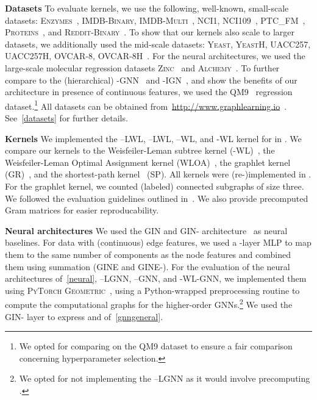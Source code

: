 \documentclass{article}
\newcommand{\xhdr}[1]{{\noindent\bfseries #1}}
\theoremstyle{definition}
\newcommand{\CC}[1][]{}
\newcommand{\wl}{-\textsf{WL}\xspace}
\newcommand{\kwl}{-\textsf{WL}\xspace}
\newcommand{\deltakwl}{--\textsf{WL}\xspace}
\newcommand{\localkwl}{--\textsf{LWL}\xspace}
\newcommand{\pluskwl}{--\textsf{LWL}\xspace}
\newcommand{\deltakwln}{--\textsf{GNN}\xspace}
\newcommand{\localkwln}{--\textsf{LGNN}\xspace}
\newcommand{\kwln}{-\textsf{WL-GNN}\xspace}
\newcommand{\kgnn}{\textrm{-}\textsf{GNN}\xspace}
\newcommand{\kign}{\textrm{-}\textsf{IGN}\xspace}
\newcommand{\shp}{\textsf{SP}\xspace}
\newcommand{\gr}{\textsf{GR}\xspace}
\newcommand{\wloa}{\textsf{WLOA}\xspace}
\newcommand{\gin}{\textsf{GIN}\xspace}
\newcommand{\gine}{\textsf{GINE}\xspace}
\newcommand{\gineps}{\textsf{GIN-}\xspace}
\newcommand{\gineeps}{\textsf{GINE-}\xspace}
\begin{document}
\xhdr{Datasets} To evaluate kernels, we use the following, well-known, small-scale datasets: \textsc{Enzymes}~\cite{Sch+2004,Bor+2005}, \textsc{IMDB-Binary}, \textsc{IMDB-Multi}~\cite{Yan+2015a}, \textsc{NCI1}, \textsc{NCI109}~\cite{Wal+2008}, \textsc{PTC\_FM}~\cite{Hel+2001}, \textsc{Proteins}~\cite{Dob+2003,Bor+2005}, and \textsc{Reddit-Binary}~\cite{Yan+2015a}. To show that our kernels also scale to larger datasets, we additionally used the mid-scale datasets: \textsc{Yeast}, \textsc{YeastH}, \textsc{UACC257}, \textsc{UACC257H}, \textsc{OVCAR-8}, \textsc{OVCAR-8H}~\cite{Yan+2008}. For the neural architectures, we used the large-scale molecular regression datasets \textsc{Zinc}~\cite{Dwi+2020,Jin+2018a} and \textsc{Alchemy}~\cite{Che+2020}.
To further compare to the (hierarchical) \kgnn~\cite{Mor+2019} and \kign~\cite{Mar+2019}, and show the benefits of our architecture in presence of continuous features, we used the \textsc{QM9}~\cite{Ram+2014,Wu+2018} regression dataset.\footnote{We opted for comparing on the \textsc{QM9} dataset to ensure a fair comparison concerning hyperparameter selection.}  All datasets can be obtained from~\url{http://www.graphlearning.io}~\cite{Mor+2020}. See~\cref{datasets} for further details.

\xhdr{Kernels} We implemented the \localkwl, \pluskwl, \deltakwl, and  \kwl kernel for  in . We compare our kernels to the Weisfeiler-Leman subtree kernel (\wl)~\cite{She+2011}, the Weisfeiler-Leman Optimal Assignment kernel (\wloa)~\cite{Kri+2016}, the graphlet kernel (\gr)~\cite{She+2009}, and the shortest-path kernel~\cite{Bor+2005} (\shp). All kernels were (re-)implemented in \CC[11]. For the graphlet kernel, we counted (labeled) connected subgraphs of size three. We followed the evaluation guidelines outlined in~\cite{Mor+2020}. We also provide precomputed Gram matrices for easier reproducability.

\xhdr{Neural architectures} We used the \gin and \gineps architecture~\cite{Xu+2018b} as neural baselines. For data with (continuous) edge features, we used a -layer MLP to map them to the same number of components as the node features and combined them using summation (\gine and \gineeps). For the evaluation of the neural architectures of~\cref{neural}, \localkwln, \deltakwln, and \kwln, we implemented them using \textsc{PyTorch Geometric}~\cite{Fey+2019}, using a  Python-wrapped \CC[11] preprocessing routine to compute the computational graphs for the higher-order GNNs.\footnote{We opted for not  implementing the \localkwln as it would involve precomputing .} We used the \gineps layer to express  and  of~\cref{gnngeneral}. 
\end{document}
